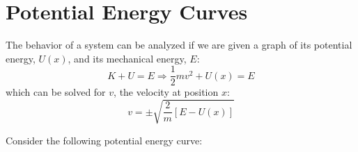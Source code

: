 \documentclass{article}
\begin{document}
\section{Potential Energy Curves}
The behavior of a system can be analyzed if we are given a graph of its potential energy, $U(x)$, and its mechanical energy, $E$:
\begin{equation*}
    K+U=E \Rightarrow \frac{1}{2}mv^{2} + U(x) = E
\end{equation*}
which can be solved for $v$, the velocity at position $x$:
\begin{equation*}
    v=\pm \sqrt{\frac{2}{m}[E-U(x)]} 
\end{equation*}

\begin{example}    

Consider the following potential energy curve:


\begin{center}

\begin{tikzpicture}[x=0.75pt,y=0.75pt,yscale=-1,xscale=1]


\end{tikzpicture}
\end{center}
\end{example}
\end{document}

